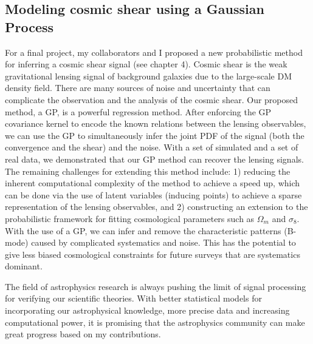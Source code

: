 \subsection{Modeling cosmic shear using a Gaussian Process}
For a final project, my collaborators and I proposed a new probabilistic method
for inferring a cosmic shear signal (see chapter 4). 
Cosmic shear is the weak 
gravitational lensing signal of background galaxies due to the large-scale DM density field. 
There are many sources of noise and uncertainty that can complicate the observation and
the analysis of the cosmic shear. 
Our proposed method, a GP, is a powerful regression method.
After enforcing the GP covariance kernel to encode the known relations between
the lensing observables, 
we can use the GP to simultaneously infer the joint PDF of the signal (both the convergence and the shear)
and the noise.  With a set of simulated and a set of real data, we demonstrated that our GP
method can recover the lensing signals.  
The remaining challenges for extending this method include: 1) reducing the
inherent computational complexity of the method to achieve a speed up, which can
be done via the use of latent variables (inducing points) to achieve a sparse representation of
the lensing observables, and 2) constructing an 
extension to the probabilistic 
framework for fitting cosmological parameters such as $\Omega_m$ and
$\sigma_8$.  With the use of a GP, we can infer and remove the characteristic
patterns (B-mode) caused by 
complicated systematics and noise. This has the potential to give less biased 
cosmological constraints for future surveys that are systematics dominant. 

The field of astrophysics research is always pushing the limit of signal
processing for verifying our scientific theories.
With better statistical models for incorporating our astrophysical knowledge, 
more precise data and increasing computational power, it is promising that the
astrophysics community can make great progress based on my contributions.   



